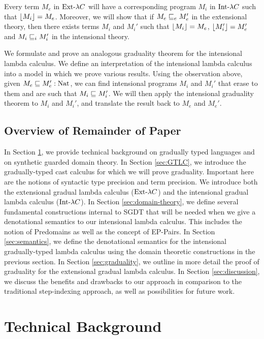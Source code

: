 \documentclass[acmsmall,screen]{acmart}
\begin{document}
  Every term $M_e$ in $\text{Ext-}\lambda C$ will have a corresponding program $M_i$ in $\text{Int-}\lambda C$ such that
  $\lfloor {M_i} \rfloor = M_e$. Moreover, we will show that if $M_e \sqsubseteq_e M_e'$ in the extensional theory,
  then there exists terms $M_i$ and $M_i'$ such that $\lfloor {M_i} \rfloor=M_e$, $\lfloor {M_i'} \rfloor=M_e'$ and
  $M_i \sqsubseteq_i M_i'$ in the intensional theory.

  We formulate and prove an analogous graduality theorem for the intensional lambda calculus.
  We define an interpretation of the intensional lambda calculus into a model in which we prove
  various results. Using the observation above, given $M_e \sqsubseteq M_e' : \text{Nat}$, we can find
  intensional programs $M_i$ and $M_i'$ that erase to them and are such that $M_i \sqsubseteq M_i'$.
  We will then apply the intensional graduality theorem to $M_i$ and $M_i'$, and translate the result
  back to $M_e$ and $M_e'$.


  \subsection{Overview of Remainder of Paper}

  In Section \ref{sec:technical-background}, we provide technical background on gradually typed languages and
  on synthetic guarded domain theory.
  In Section \ref{sec:GTLC}, we introduce the gradually-typed cast calculus
  for which we will prove graduality. Important here are the notions of syntactic
  type precision and term precision. We introduce both the extensional gradual lambda calculus
  ($\text{Ext-}\lambda C$) and the intensional gradual lambda calculus ($\text{Int-}\lambda C$).
%
  In Section \ref{sec:domain-theory}, we define several fundamental constructions
  internal to SGDT that will be needed when we give a denotational semantics to
  our intensional lambda calculus.
  This includes the notion of Predomains as well as the concept
  of EP-Pairs.
%
  In Section \ref{sec:semantics}, we define the denotational semantics for the
  intensional gradually-typed lambda calculus using the domain theoretic constructions in the
  previous section.
%
  In Section \ref{sec:graduality}, we outline in more detail the proof of graduality for the
  extensional gradual lambda calculus.
%
  In Section \ref{sec:discussion}, we discuss the benefits and drawbacks to our approach in comparison
  to the traditional step-indexing approach, as well as possibilities for future work.


\section{Technical Background}\label{sec:technical-background}
\end{document}
